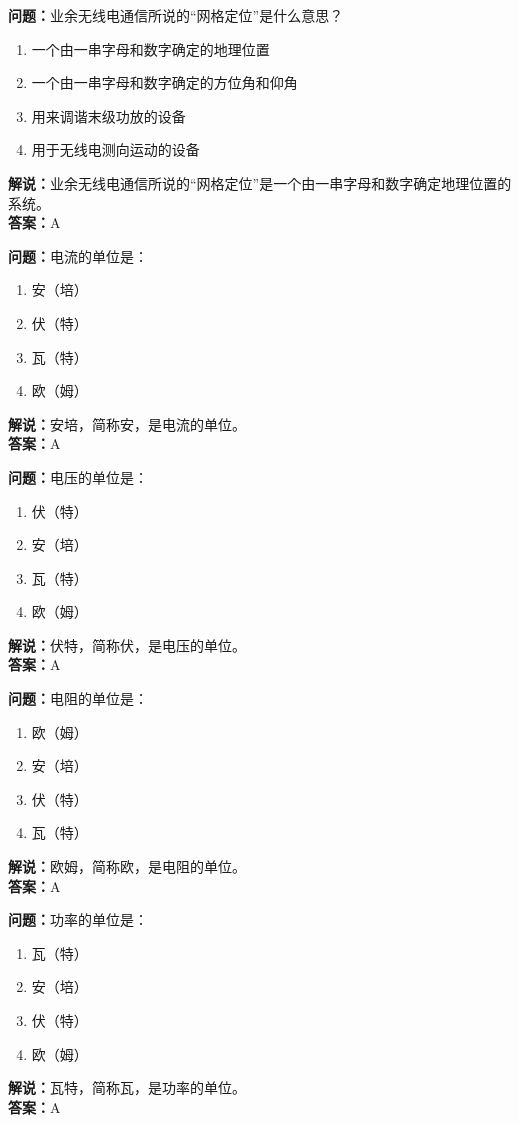 \documentclass[UTF8]{ctexbook}
\begin{document}
\textbf{问题：}业余无线电通信所说的“网格定位”是什么意思？
\begin{enumerate}[label=\Alph*), leftmargin=3em]
  \item 一个由一串字母和数字确定的地理位置
  \item 一个由一串字母和数字确定的方位角和仰角
  \item 用来调谐末级功放的设备
  \item 用于无线电测向运动的设备
\end{enumerate}
\textbf{解说：}业余无线电通信所说的“网格定位”是一个由一串字母和数字确定地理位置的系统。\\
\textbf{答案：}A

\textbf{问题：}电流的单位是：
\begin{enumerate}[label=\Alph*), leftmargin=3em]
  \item 安（培）
  \item 伏（特）
  \item 瓦（特）
  \item 欧（姆）
\end{enumerate}
\textbf{解说：}安培，简称安，是电流的单位。\\
\textbf{答案：}A

\textbf{问题：}电压的单位是：
\begin{enumerate}[label=\Alph*), leftmargin=3em]
  \item 伏（特）
  \item 安（培）
  \item 瓦（特）
  \item 欧（姆）
\end{enumerate}
\textbf{解说：}伏特，简称伏，是电压的单位。\\
\textbf{答案：}A

\textbf{问题：}电阻的单位是：
\begin{enumerate}[label=\Alph*), leftmargin=3em]
  \item 欧（姆）
  \item 安（培）
  \item 伏（特）
  \item 瓦（特）
\end{enumerate}
\textbf{解说：}欧姆，简称欧，是电阻的单位。\\
\textbf{答案：}A

\textbf{问题：}功率的单位是：
\begin{enumerate}[label=\Alph*), leftmargin=3em]
  \item 瓦（特）
  \item 安（培）
  \item 伏（特）
  \item 欧（姆）
\end{enumerate}
\textbf{解说：}瓦特，简称瓦，是功率的单位。\\
\textbf{答案：}A
\end{document}
